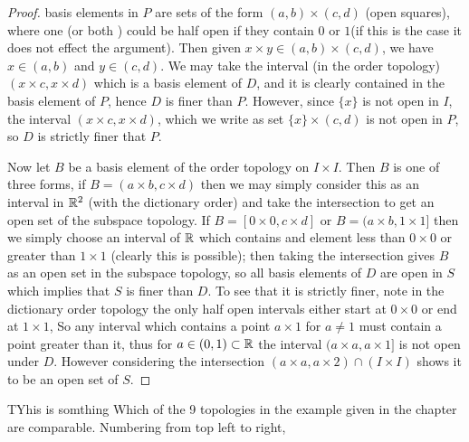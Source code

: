 \begin{proof}
    basis elements in $P$ are sets of the form $(a, b) \times (c, d)$ (open squares), where one (or both ) could be half open if they contain $0$ or $1$(if this is the case it does not effect the argument). 
    Then given $x \times y \in (a, b) \times (c, d)$, we have $x \in (a, b)$ and $y \in (c, d)$. We may take the interval (in the order topology) $(x \times c, x \times d)$ 
    which is a basis element of $D$, and it is clearly contained in the basis element of $P$, hence $D$ is finer than $P$. However, since $\{x\}$ is not open in $I$, the interval 
    $(x \times c, x \times d)$, which we write as set $\{x\} \times (c, d)$ is not open in $P$, so $D$ is strictly finer that $P$. 

    Now let $B$ be a basis element of the order topology on $I \times I$. Then $B$ is one of three forms, if $B = (a \times b, c \times d)$ then we may simply consider 
    this as an interval in $\mathbb{R}^2$ (with the dictionary order) and take the intersection to get an open set of the subspace topology. If $B = [0 \times 0, c \times d]$ 
    or $B = (a \times b, 1 \times 1]$ then we simply choose an interval of $\mathbb{R}$ which contains and element less than $0 \times 0$ or greater than $1 \times 1$ (clearly this is possible); 
    then taking the intersection gives $B$ as an open set in the subspace topology, so all basis elements of $D$ are open in $S$ which implies that $S$ is finer than $D$. 
    To see that it is strictly finer, note in the dictionary order topology the only half open intervals either start at $0 \times 0$ or end at $1 \times 1$, So 
    any interval which contains a point $a \times 1$ for $a \neq 1$ must contain a point greater than it, thus for $a \in (0, 1) \subset \mathbb{R}$ the interval $(a \times a, a \times 1 ]$ is not 
    open under $D$. However considering the intersection $(a \times a, a \times 2) \cap (I \times I)$ shows it to be an open set of $S$. 
\end{proof}

\newpage 

\question 
TYhis is somthing Which of the 9 topologies in the example given in the chapter are comparable. Numbering from top left to right, 

